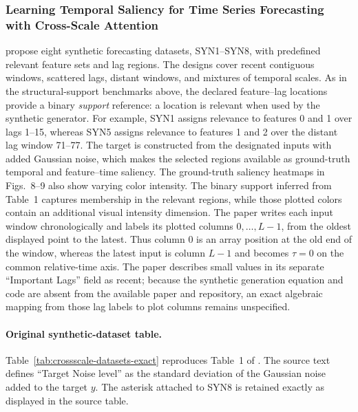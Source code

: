\subsubsection{Learning Temporal Saliency for Time Series Forecasting with Cross-Scale Attention}

\citet{delibasoglu2025crossscale} propose eight synthetic forecasting datasets,
SYN1--SYN8, with predefined relevant feature sets and lag regions. The designs
cover recent contiguous windows, scattered lags, distant windows, and mixtures
of temporal scales. As in the structural-support benchmarks above, the
declared feature--lag locations provide a binary \emph{support} reference:
a location is relevant when used by the synthetic generator. For example, SYN1 assigns
relevance to features 0 and 1 over lags 1--15,
whereas SYN5 assigns relevance to features 1 and 2 over the distant lag window
71--77. The target is constructed from the designated inputs with added
Gaussian noise, which makes the selected regions available as ground-truth
temporal and feature--time saliency. The ground-truth saliency heatmaps in
Figs.~8--9 also show varying color intensity. The binary support inferred from
Table~1 captures membership in the relevant regions, while those plotted colors
contain an additional visual intensity dimension. The paper writes each input
window chronologically and labels its plotted columns $0,\ldots,L-1$, from the
oldest displayed point to the latest. Thus column 0 is an array position at the
old end of the window, whereas the latest input is column $L-1$ and becomes
$\tau=0$ on the common relative-time axis. The paper describes small values in
its separate ``Important Lags'' field as recent; because the synthetic
generation equation and code are absent from the available paper and
repository, an exact algebraic mapping from those lag labels to plot columns
remains unspecified.

\paragraph{Original synthetic-dataset table.}
Table~\ref{tab:crossscale-datasets-exact} reproduces Table~1 of
\citet{delibasoglu2025crossscale}. The source text defines ``Target Noise
level'' as the standard deviation of the Gaussian noise added to the target
$y$. The asterisk attached to SYN8 is retained exactly as displayed in the
source table.


